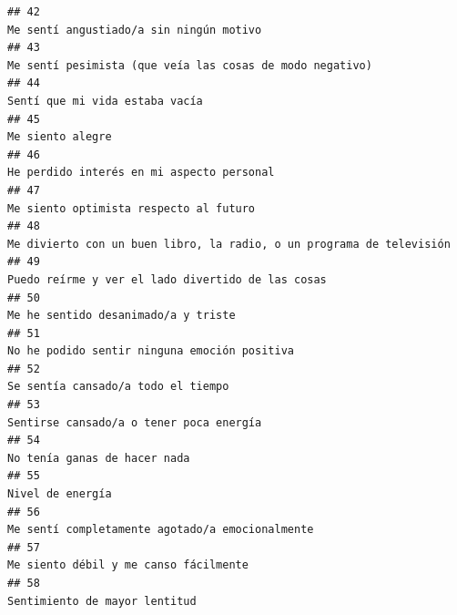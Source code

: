 \documentclass[
]{article}
\begin{document}
\begin{verbatim}
## 42                                                                                                                   Me sentí angustiado/a sin ningún motivo
## 43                                                                                                  Me sentí pesimista (que veía las cosas de modo negativo)
## 44                                                                                                                            Sentí que mi vida estaba vacía
## 45                                                                                                                                          Me siento alegre
## 46                                                                                                                 He perdido interés en mi aspecto personal
## 47                                                                                                                    Me siento optimista respecto al futuro
## 48                                                                                      Me divierto con un buen libro, la radio, o un programa de televisión
## 49                                                                                                         Puedo reírme y ver el lado divertido de las cosas
## 50                                                                                                                       Me he sentido desanimado/a y triste
## 51                                                                                                              No he podido sentir ninguna emoción positiva
## 52                                                                                                                        Se sentía cansado/a todo el tiempo
## 53                                                                                                                   Sentirse cansado/a o tener poca energía
## 54                                                                                                                              No tenía ganas de hacer nada
## 55                                                                                                                                          Nivel de energía
## 56                                                                                                           Me sentí completamente agotado/a emocionalmente
## 57                                                                                                                     Me siento débil y me canso fácilmente
## 58                                                                                                                             Sentimiento de mayor lentitud

\end{verbatim}
\end{document}

